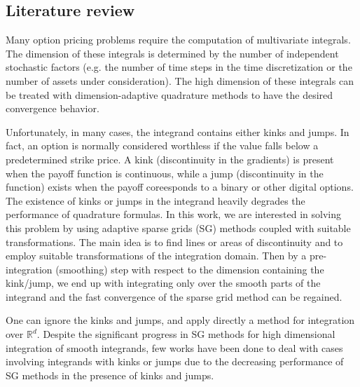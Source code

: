 \documentclass[11pt]{article}
\newcommand{\rset}{\mathbb{R}}
\begin{document}
\subsection{Literature review}




Many option pricing problems  require the computation of multivariate integrals. The dimension of these integrals
is determined by the number of independent stochastic factors (e.g. the number of time steps in the time discretization or the number of assets under consideration).  The high dimension of these integrals can be treated with dimension-adaptive quadrature methods to have the desired convergence behavior.

Unfortunately, in many cases, the  integrand contains either kinks and jumps. In fact, an option is normally considered worthless if the value falls below a predetermined strike price.  A kink  (discontinuity in the gradients) is present when the payoff function is  continuous, while a jump (discontinuity in the function)  exists when the payoff coreesponds to a binary or other digital options. The existence of kinks or jumps in the integrand  heavily degrades
the performance of quadrature formulas.  In this work, we are interested in solving this problem  by using adaptive  sparse grids (SG) methods coupled with suitable transformations. The main idea is to find lines or areas of discontinuity and to employ suitable transformations of the integration domain. Then  by a pre-integration (smoothing) step with respect to the dimension containing the kink/jump,  we end up with integrating  only over the smooth parts of the integrand and the fast convergence of the sparse grid method can be regained.


One can ignore the kinks and jumps, and apply directly a method for integration over $\rset^d$.  Despite the  significant progress in SG methods \cite{bungartz2004sparse} for high dimensional integration  of  smooth integrands, few works have been done to deal with  cases involving integrands with kinks or jumps due to the decreasing performance of SG methods in the presence of kinks and jumps. 
\end{document}
